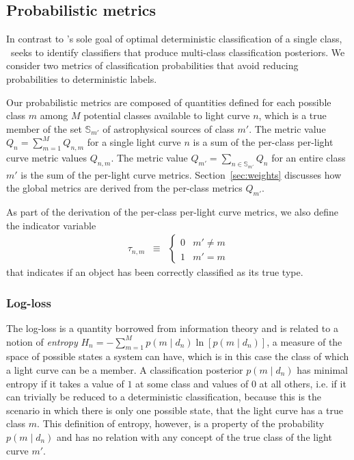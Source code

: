 \subsection{Probabilistic metrics}
\label{sec:probabilistic}

In contrast to \snphotcc's sole goal of optimal deterministic classification of a single class, \plasticc\ seeks to identify classifiers that produce multi-class classification posteriors.
We consider two metrics of classification probabilities that avoid reducing probabilities to deterministic labels.

Our probabilistic metrics are composed of quantities defined for each possible class $m$ among $M$ potential classes available to light curve $n$, which is a true member of the set $\mathbb{S}_{m'}$ of astrophysical sources of class $m'$.
The metric value $Q_{n} = \sum_{m=1}^{M} Q_{n, m}$ for a single light curve $n$ is a sum of the per-class per-light curve metric values $Q_{n, m}$.
The metric value $Q_{m'} = \sum_{n \in \mathbb{S}_{m'}} Q_{n}$ for an entire class $m'$ is the sum of the per-light curve metrics.
Section~\ref{sec:weights} discusses how the global metrics are derived from the per-class metrics $Q_{m'}$.

As part of the derivation of the per-class per-light curve metrics, we also define the indicator variable
\begin{eqnarray}
  \label{eq:indicator}
  \tau_{n, m} &\equiv& \begin{cases}
  0 & m' \neq m\\
  1 & m' = m
  \end{cases}
\end{eqnarray}
that indicates if an object has been correctly classified as its true type.

\subsubsection{Log-loss}
\label{sec:logloss}

The log-loss is a quantity borrowed from information theory and is related to a notion of \textit{entropy} $H_{n} = - \sum_{m=1}^{M} p(m \mid d_{n}) \ln[p(m \mid d_{n})]$, a measure of the space of possible states a system can have, which is in this case the class of which a light curve can be a member.
A classification posterior $p(m \mid d_{n})$ has minimal entropy if it takes a value of $1$ at some class and values of $0$ at all others, i.e. if it can trivially be reduced to a deterministic classification, because this is the scenario in which there is only one possible state, that the light curve has a true class $m$.
This definition of entropy, however, is a property of the probability $p(m \mid d_{n})$ and has no relation with any concept of the true class of the light curve $m'$.


